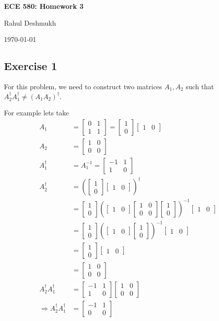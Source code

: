 \documentclass[11pt]{article}
\newcommand{\mat}[1]{\begin{bmatrix}#1\end{bmatrix}}
\begin{document}
\begin{center}
\Large{\textbf{ECE 580: Homework 3}}

Rahul Deshmukh

\today
\end{center}



\subsection*{Exercise 1} 
For this problem, we need to construct two matrices $A_1,A_2$ such that $A_2^{\dagger}A_1^{\dagger} \neq (A_1A_2)^{\dagger} $.

For example lets take 
\begin{align}
 A_1 &= \mat{ 0 & 1\\ 1& 1}= \mat{1\\0}\mat{1& 0}\nonumber\\
 A_2 &= \mat{1 & 0\\ 0& 0}\nonumber\\
 A_1^{\dagger} &= A_1^{-1} = \mat{-1 & 1\\ 1 & 0}\nonumber\\
 A_2^{\dagger} &= (\mat{1\\0}\mat{1& 0})^{\dagger}\nonumber\\
 &= \mat{1\\0}\left( \mat{1&0} \mat{1 & 0\\ 0& 0} \mat{1\\0} \right)^{-1}\mat{1 & 0}\nonumber\\
 & = \mat{1\\0}\left( \mat{1&0} \mat{1\\0}\right)^{-1}\mat{1 & 0}\nonumber\\
 & = \mat{1\\0}\mat{1 & 0}\nonumber\\
 & = \mat{1 & 0\\ 0& 0}\nonumber\\
 A_2^{\dagger}A_1^{\dagger} &= \mat{-1 & 1\\ 1 & 0}\mat{1 & 0\\ 0& 0} \nonumber\\
 \Rightarrow A_2^{\dagger}A_1^{\dagger} & = \mat{-1& 1\\ 0& 0 } \label{eq:1}
\end{align}
\end{document}
